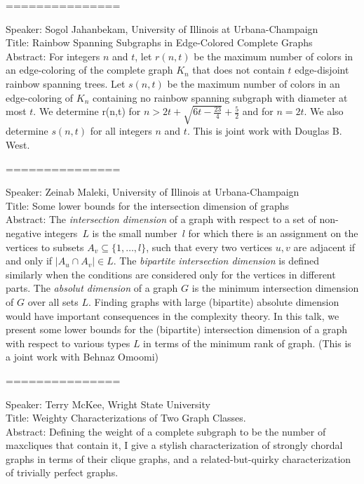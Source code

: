 \documentclass[11pt]{article}
\begin{document}
===============

Speaker: Sogol Jahanbekam, University of Illinois at Urbana-Champaign\\
Title: Rainbow Spanning Subgraphs in Edge-Colored Complete Graphs \\
Abstract:  For integers $n$ and $t$, let $r(n,t)$ be the maximum number of
colors in an
edge-coloring of the complete graph $K_n$ that does not contain $t$
edge-disjoint rainbow spanning trees.  Let $s(n,t)$ be the maximum number of
colors in an edge-coloring of $K_n$ containing no rainbow spanning subgraph
with diameter at most $t$.  We determine r(n,t) for
$n>2t+\sqrt{6t-\frac{23}{4}}+\frac52$ and for $n=2t$. We also determine
$s(n,t)$ for all integers $n$ and $t$. 
This is joint work with Douglas B. West. 



===============

Speaker: Zeinab Maleki, University of Illinois at Urbana-Champaign\\
Title: Some lower bounds for the intersection dimension of graphs\\
Abstract:  The {\it intersection dimension} of a graph with respect to a set
of non-negative integers~$L$ is the small number~$l$ for which there is an
assignment on the vertices to subsets $A_v \subseteq \{1,\dots, l\}$, such
that every two vertices $u,v$ are adjacent if and only if $|A_u \cap A_v|\in
L$.
The {\it bipartite intersection dimension} is defined similarly when the
conditions are considered only for the vertices in different parts. The {\it
absolut dimension} of a graph $G$ is the minimum intersection dimension of
$G$ over all sets $L$. Finding graphs with large (bipartite) absolute
dimension would have important consequences in the complexity theory.
In this talk, we present some lower bounds for the (bipartite) intersection
dimension of a graph with respect to various types $L$ in terms of the
minimum rank of graph.
(This is a joint work with Behnaz Omoomi)




===============


Speaker: Terry McKee, Wright State University\\
Title: Weighty Characterizations of Two Graph Classes.\\
Abstract: Defining the weight of a complete subgraph to be the number of
maxcliques that contain it, I give a stylish characterization of strongly
chordal graphs in terms of their clique graphs, and a related-but-quirky
characterization of trivially perfect graphs. 
\end{document}
